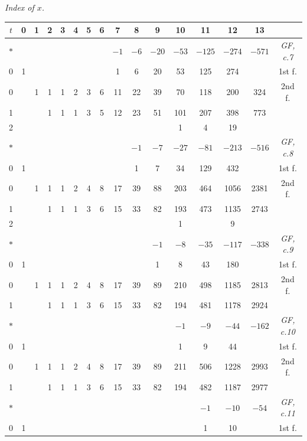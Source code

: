 \documentclass[11pt,a4paper]{article}
\begin{document}
\begin{small}
\begin{center}
\textit{Index of $x$.}
\end{center}
\begin{longtable}{|c|cccccccccccccc|c|}
\hline
$t$ & 0 & 1 & 2 & 3 & 4 & 5 & 6 & 7 & 8 & 9 & 10 & 11 & 12 & 13 & \\
\hline
\endhead
$*$ & & & & & & & & $-1$ & $-6$ & $-20$ & $-53$ & $-125$ & $-274$ & $-571$ & \textit{GF, c.7} \\
\hline
0 & 1 & & & & & & & 1 & 6 & 20 & 53 & 125 & 274 & & 1st f. \\
\hline
0 & & 1 & 1 & 1 & 2 & 3 & 6 & 11 & 22 & 39 & 70 & 118 & 200 & 324 & 2nd f. \\
1 & & & 1 & 1 & 1 & 3 & 5 & 12 & 23 & 51 & 101 & 207 & 398 & 773 \\
2 & & & & & & & & & & & 1 & 4 & 19 &  \\
\hline
$*$ & & & & & & & & & $-1$ & $-7$ & $-27$ & $-81$ & $-213$ & $-516$ & \textit{GF, c.8} \\
\hline
0 & 1 & & & & & & & & 1 & 7 & 34 & 129 & 432 & & 1st f. \\
\hline
0 & & 1 & 1 & 1 & 2 & 4 & 8 & 17 & 39 & 88 & 203 & 464 & 1056 & 2381 & 2nd f. \\
1 & & & 1 & 1 & 1 & 3 & 6 & 15 & 33 & 82 & 193 & 473 & 1135 & 2743 \\
2 & & & & & & & & & & & 1 & & 9 &  \\
\hline
$*$ & & & & & & & & & & $-1$ & $-8$ & $-35$ & $-117$ & $-338$ & \textit{GF, c.9} \\
\hline
0 & 1 & & & & & & & & & 1 & 8 & 43 & 180 & & 1st f. \\
\hline
0 & & 1 & 1 & 1 & 2 & 4 & 8 & 17 & 39 & 89 & 210 & 498 & 1185 & 2813 & 2nd f. \\
1 & & & 1 & 1 & 1 & 3 & 6 & 15 & 33 & 82 & 194 & 481 & 1178 & 2924 \\
\hline
$*$ & & & & & & & & & & & $-1$ & $-9$ & $-44$ & $-162$ & \textit{GF, c.10} \\
\hline
0 & 1 & & & & & & & & & & 1 & 9 & 44 & & 1st f. \\
\hline
0 & & 1 & 1 & 1 & 2 & 4 & 8 & 17 & 39 & 89 & 211 & 506 & 1228 & 2993 & 2nd f. \\
1 & & & 1 & 1 & 1 & 3 & 6 & 15 & 33 & 82 & 194 & 482 & 1187 & 2977 \\
\hline
$*$ & & & & & & & & & & & & $-1$ & $-10$ & $-54$ & \textit{GF, c.11} \\
\hline
0 & 1 & & & & & & & & & & & 1 & 10 & & 1st f. \\

\end{longtable}
\end{small}
\end{document}
